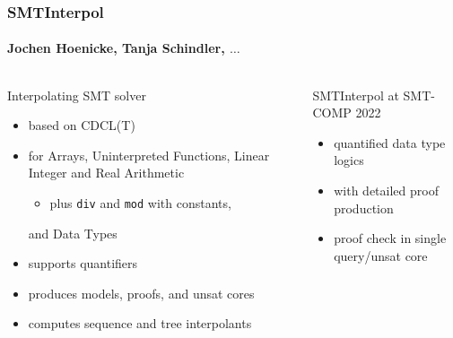 \documentclass[table,aspectratio=169]{beamer}
\institute[Uni Freiburg]{University of Freiburg\hspace{1cm}\pgfuseimage{unifr}}
\begin{document}
\begin{frame}
  \frametitle{SMTInterpol}
  \framesubtitle{Jochen Hoenicke, Tanja Schindler, $\ldots$}
  
  \vspace{1ex}
  \begin{columns}[t]
  \begin{column}{.5\textwidth}
  Interpolating SMT solver
    \begin{itemize}
    \item based on CDCL(T)
      
    \item for Arrays, Uninterpreted Functions, Linear Integer and Real Arithmetic
    \begin{itemize}
      \item plus \texttt{div} and \texttt{mod} with constants,
    \end{itemize}
    and Data Types
    
    \item supports quantifiers
    
    \item produces models, proofs, and unsat cores
    
    \item computes sequence and tree interpolants
    \end{itemize}
  \end{column}
  
  \hfill\textcolor{ALUblue}{\vrule width 1pt }\hfill{}
  
  \begin{column}{.5\textwidth}
    SMTInterpol at SMT-COMP 2022
    \begin{itemize}
    \item \alert{quantified data type} logics

    \item with \alert{detailed proof production}
      
    \item \alert{proof check} in single query/unsat core
    
    \end{itemize}


\end{column}
\end{columns}
\end{frame}
\end{document}
